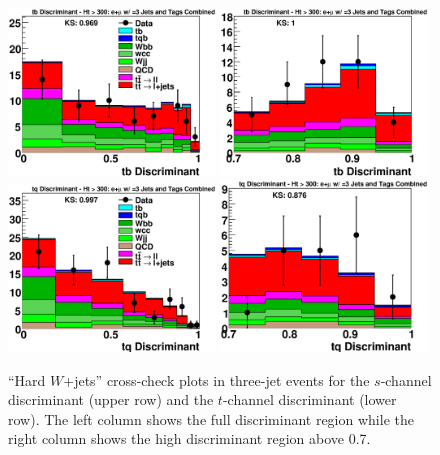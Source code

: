 \clearpage
\begin{figure}[!h!tbp]
\includegraphics[width=0.49\textwidth]
{eps/MatrixElement/cross_check/combined/3jet/TTbar_tb_Discriminant}
\includegraphics[width=0.49\textwidth]
{eps/MatrixElement/cross_check/combined/3jet/TTbar_tb_Discriminant_Zoom}
\includegraphics[width=0.49\textwidth]
{eps/MatrixElement/cross_check/combined/3jet/TTbar_tq_Discriminant}
\includegraphics[width=0.49\textwidth]
{eps/MatrixElement/cross_check/combined/3jet/TTbar_tq_Discriminant_Zoom}
\vspace{-0.1in}
\caption{``Hard $W$+jets'' cross-check plots in three-jet
events for the $s$-channel discriminant (upper row) and the $t$-channel discriminant
(lower row). The left column shows the full discriminant region while
the right column shows the high discriminant region above 0.7.}
\label{ttbar-cross-3jet}
\end{figure}

